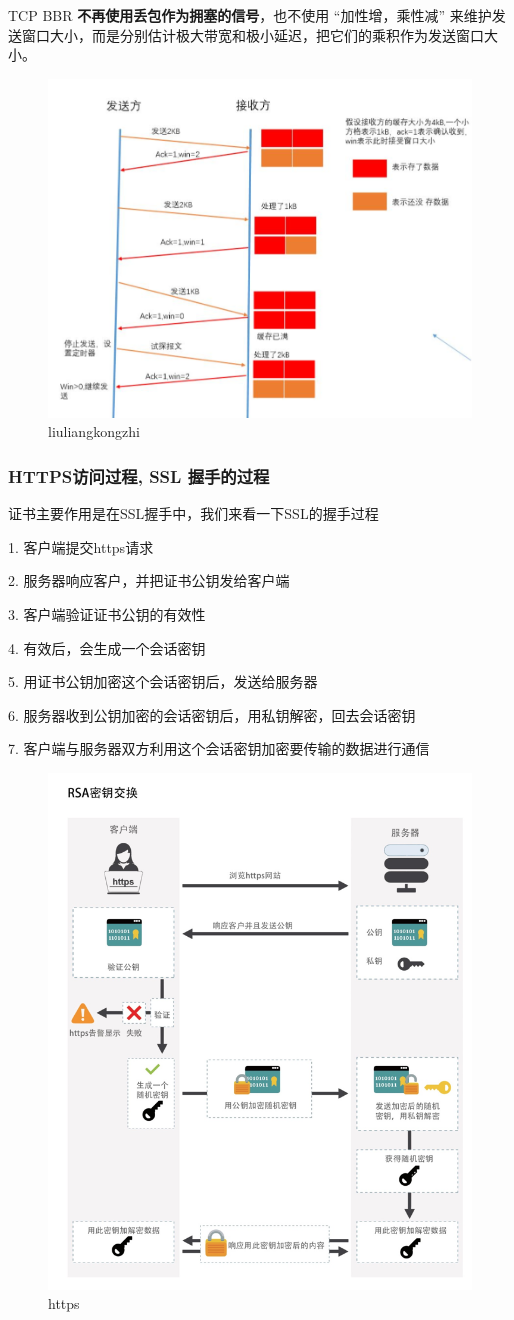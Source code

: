 TCP BBR \textbf{不再使用丢包作为拥塞的信号}，也不使用 “加性增，乘性减” 来维护发送窗口大小，而是分别估计极大带宽和极小延迟，把它们的乘积作为发送窗口大小。
\begin{figure}
	\centering
	\includegraphics[width=0.7\linewidth]{figures/liuliangkongzhi.png}
	\caption{liuliangkongzhi}
	\label{fig:liuliangkongzhi}
\end{figure}
\subsubsection{HTTPS访问过程, SSL 握手的过程}
证书主要作用是在SSL握手中，我们来看一下SSL的握手过程

1. 客户端提交https请求

2. 服务器响应客户，并把证书公钥发给客户端

3. 客户端验证证书公钥的有效性

4. 有效后，会生成一个会话密钥

5. 用证书公钥加密这个会话密钥后，发送给服务器

6. 服务器收到公钥加密的会话密钥后，用私钥解密，回去会话密钥

7. 客户端与服务器双方利用这个会话密钥加密要传输的数据进行通信

\begin{figure}
	\centering
	\includegraphics[width=0.7\linewidth]{figures/https.png}
	\caption{https}
	\label{fig:https}
\end{figure}

